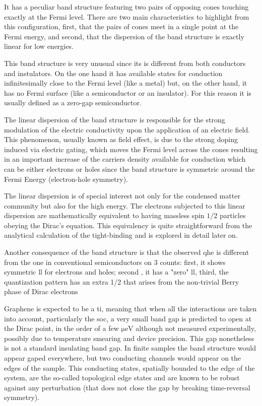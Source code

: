 It has a peculiar band structure featuring two pairs of opposing cones touching exactly at the Fermi level. There are two main characteristics to highlight from this configuration, first, that the pairs of cones meet in a single point at the Fermi energy, and second, that the dispersion of the band structure is exactly linear for low energies.

This band structure is very unusual since its is different from both conductors and instulators. On the one hand it has available states for conduction infinitesimally close to the Fermi level (like a metal) but, on the other hand, it has no Fermi surface (like a semiconductor or an insulator). For this reason it is usually defined as a zero-gap semiconductor.

The linear dispersion of the band structure is responsible for the strong modulation of the electric conductivity upon the application of an electric field. This phenomenon, usually known as field effect, is due to the strong doping induced via electric gating, which moves the Fermi level across the cones resulting in an important increase of the carriers density available for conduction which can be either electrons or holes since the band structure is symmetric around the Fermi Energy (electron-hole symmetry).
\medskip

The linear dispersion is of special interest not only for the condensed matter community but also for the high energy. The electrons  subjected to this linear dispersion are mathematically equivalent to having massless spin $1/2$ particles obeying the Dirac's equation. This equivalency is quite straightforward from the analytical calculation of the tight-binding and is explored in detail later on.
\medskip


Another consequence of the band structure is that the observed \ac{qhe}\cite{Zheng2002,Zhang2005,Gusynin2005,Peres2006a,Brey2006,Fertig2007,Ostrovsky2008,Fujita2016} is different from the one in conventional semiconductors on 3  counts: first, it shows symmetric \ac{ll} for electrons and holes; second , it has a "zero" \ac{ll}, third, the quantization pattern has an extra 1/2 that arises from the non-trivial Berry phase of Dirac electrons

Graphene is expected to be a \ac{ti}\cite{Blick2019}, meaning that when all the interactions are taken into account, particularly the \ac{soc}, a very small band gap is predicted to open at the Dirac point, in the order of a few $\si{\micro\eV}$ although not measured experimentally, possibly due to temperature smearing and device precision.\cite{Kane2005,Min2006}
This gap nonetheless is not a standard insulating band gap. In finite samples the band structure would appear gaped everywhere, but two conducting channels would appear on the edges of the sample.
This conducting states, spatially bounded to the edge of the system, are the so-called topological edge states and are known to be robust against any perturbation (that does not close the gap by breaking time-reversal symmetry).  %

